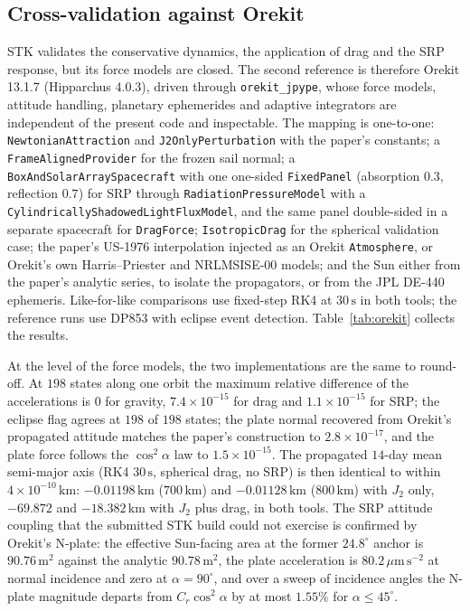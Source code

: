 \subsection{Cross-validation against Orekit}
\label{sec:val_orekit}
\noindent STK validates the conservative dynamics, the application of drag and the SRP response, but its force models are closed. The second reference is therefore Orekit 13.1.7 (Hipparchus 4.0.3), driven through \texttt{orekit\_jpype}, whose force models, attitude handling, planetary ephemerides and adaptive integrators are independent of the present code and inspectable. The mapping is one-to-one: \texttt{NewtonianAttraction} and \texttt{J2OnlyPerturbation} with the paper's constants; a \texttt{FrameAlignedProvider} for the frozen sail normal; a \texttt{BoxAndSolarArraySpacecraft} with one one-sided \texttt{FixedPanel} (absorption \(0.3\), reflection \(0.7\)) for SRP through \texttt{RadiationPressureModel} with a \texttt{CylindricallyShadowedLightFluxModel}, and the same panel double-sided in a separate spacecraft for \texttt{DragForce}; \texttt{IsotropicDrag} for the spherical validation case; the paper's US-1976 interpolation injected as an Orekit \texttt{Atmosphere}, or Orekit's own Harris--Priester and NRLMSISE-00 models; and the Sun either from the paper's analytic series, to isolate the propagators, or from the JPL DE-440 ephemeris. Like-for-like comparisons use fixed-step RK4 at \(30\,\mathrm{s}\) in both tools; the reference runs use DP853 with eclipse event detection. Table~\ref{tab:orekit} collects the results.

\vspace{5pt}
\par\noindent At the level of the force models, the two implementations are the same to round-off. At \(198\) states along one orbit the maximum relative difference of the accelerations is \(0\) for gravity, \(7.4\times10^{-15}\) for drag and \(1.1\times10^{-15}\) for SRP; the eclipse flag agrees at \(198\) of \(198\) states; the plate normal recovered from Orekit's propagated attitude matches the paper's construction to \(2.8\times10^{-17}\), and the plate force follows the \(\cos^2\alpha\) law to \(1.5\times10^{-15}\). The propagated \(14\)-day mean semi-major axis (RK4 \(30\,\mathrm{s}\), spherical drag, no SRP) is then identical to within \(4\times10^{-10}\,\mathrm{km}\): \(-0.01198\,\mathrm{km}\) (\(700\,\mathrm{km}\)) and \(-0.01128\,\mathrm{km}\) (\(800\,\mathrm{km}\)) with \(J_2\) only, \(-69.872\) and \(-18.382\,\mathrm{km}\) with \(J_2\) plus drag, in both tools. The SRP attitude coupling that the submitted STK build could not exercise is confirmed by Orekit's N-plate: the effective Sun-facing area at the former \(24.8^\circ\) anchor is \(90.76\,\mathrm{m^2}\) against the analytic \(90.78\,\mathrm{m^2}\), the plate acceleration is \(80.2\,\mu\mathrm{m\,s^{-2}}\) at normal incidence and zero at \(\alpha = 90^\circ\), and over a sweep of incidence angles the N-plate magnitude departs from \(C_r\cos^2\alpha\) by at most \(1.55\%\) for \(\alpha \le 45^\circ\).

